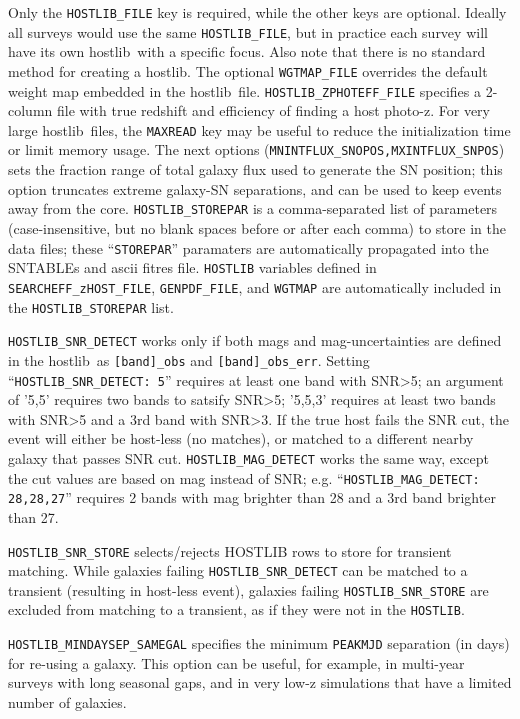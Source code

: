 \documentclass[12pt]{article}
\newcommand{\hostlib}{{\sc hostlib}}
\begin{document}
{\begin{Verbatim}[frame=single]
\end{Verbatim}
Only the \verb|HOSTLIB_FILE| key is required, while the
other keys are optional. Ideally all surveys would use
the same {\tt HOSTLIB\_FILE}, but in practice each survey
will have its own \hostlib\ with a specific focus.
Also note that there is no standard method for creating 
a \hostlib. The optional \verb|WGTMAP_FILE| overrides the 
default weight map embedded in the
\hostlib\ file. 
\verb|HOSTLIB_ZPHOTEFF_FILE| specifies a 2-column file with
true redshift and efficiency of finding a host photo-z.
For very large \hostlib\ files,
the {\tt MAXREAD} key may be useful to reduce the 
initialization time or limit memory usage.
The next options ({\tt MNINTFLUX\_SNOPOS,MXINTFLUX\_SNPOS}) sets the
fraction range of total galaxy flux used to generate the
SN position; this option truncates extreme galaxy-SN
separations, and can be used to keep events away from the core.
\verb|HOSTLIB_STOREPAR| is a comma-separated
list of parameters (case-insensitive, but no blank spaces
before or after each comma) to store in the data files;
these ``{\tt STOREPAR}'' paramaters are automatically propagated 
into the SNTABLEs  and ascii fitres file.
\verb|HOSTLIB| variables defined in 
\verb|SEARCHEFF_zHOST_FILE|,
\verb|GENPDF_FILE|, and
\verb|WGTMAP|
are automatically included in the \verb|HOSTLIB_STOREPAR| list.


\verb|HOSTLIB_SNR_DETECT| works only if both mags and mag-uncertainties
are defined in the \hostlib\ as \verb|[band]_obs| and \verb|[band]_obs_err|.
Setting ``\verb|HOSTLIB_SNR_DETECT: 5|'' requires at least one band with
SNR>5; an argument of '5,5' requires two bands to satsify SNR>5;
'5,5,3' requires at least two bands with SNR>5 and a 3rd band with SNR>3.
If the true host fails the SNR cut, the event will either be host-less
(no matches), or matched to a different nearby galaxy that
passes SNR cut.  \verb|HOSTLIB_MAG_DETECT| works the same way,
except the cut values are based on mag instead of SNR;
e.g. ``\verb|HOSTLIB_MAG_DETECT: 28,28,27|'' requires 2 bands with mag brighter
than 28 and a 3rd band brighter than 27.

\verb|HOSTLIB_SNR_STORE| selects/rejects HOSTLIB rows to store for transient matching.
While galaxies failing \verb|HOSTLIB_SNR_DETECT| can be matched
to a transient (resulting in host-less event), 
galaxies failing \verb|HOSTLIB_SNR_STORE| are excluded from 
matching to a transient, as if they were not in the {\tt HOSTLIB}.

\verb|HOSTLIB_MINDAYSEP_SAMEGAL| specifies the minimum
{\tt PEAKMJD} separation (in days) for re-using a galaxy.
This option can be useful, for example, in multi-year surveys 
with long seasonal gaps, and in very low-z simulations that have 
a limited number of galaxies.


}
\end{document}
